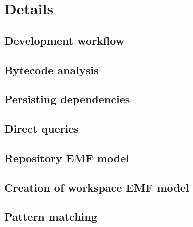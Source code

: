 \chapter{Details}

\section{Development workflow}

\section{Bytecode analysis}

\section{Persisting dependencies}

\section{Direct queries}

\section{Repository EMF model}

\section{Creation of workspace EMF model}

\section{Pattern matching}


